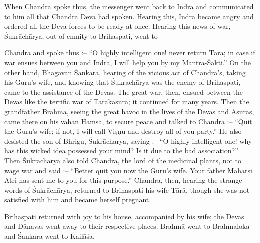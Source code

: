 When Chandra spoke thus, the messenger went back to Indra and communicated to him all that Chandra Deva had spoken. Hearing this, Indra became angry and ordered all the Deva forces to be ready at once. Hearing this news of war, \'Sukr\=ach\=arya, out of enmity to Brihaspati, went to

Chandra and spoke thus :-- ``O highly intelligent one! never return T\=ar\=a; in case if war ensues between you and Indra, I will help you by my Mantra-\'Sakti.'' On the other hand, Bhagav\=an \'Sankara, hearing of the vicious act of Chandra's, taking his Guru's wife, and knowing that \'Sukrach\=arya was the enemy of Brihaspati, came to the assistance of the Devas. The great war, then, ensued between the Devas like the terrific war of T\=arak\=asura; it continued for many years. Then the grandfather Brahma, seeing the great havoc in the lives of the Devas and Asuras, came there on his v\=ahan Hamsa, to secure peace and talked to Chandra :-- ``Quit the Guru's wife; if not, I will call Vi\d{s}\d{n}u and destroy all of you party.'' He also desisted the son of Bhrigu, \'Sukr\=acharya, saying :-- ``O highly intelligent one! why has this wicked idea possessed your mind? Is it due to the bad association?'' Then \'Sukr\=ach\=arya also told Chandra, the lord of the medicinal plants, not to wage war and said :-- ``Better quit you now the Guru's wife. Your father Mahar\d{s}i Atri has sent me to you for this purpose.'' Chandra, then, hearing the strange words of \'Sukr\=ach\=arya, returned to Brihaspati his wife T\=ar\=a, though she was not satisfied with him and became herself pregnant.

Brihaspati returned with joy to his house, accompanied by his wife; the Devas and D\=anavas went away to their respective places. Brahm\=a went to Brahmaloka and \'Sankara went to Kail\=a\'sa.

